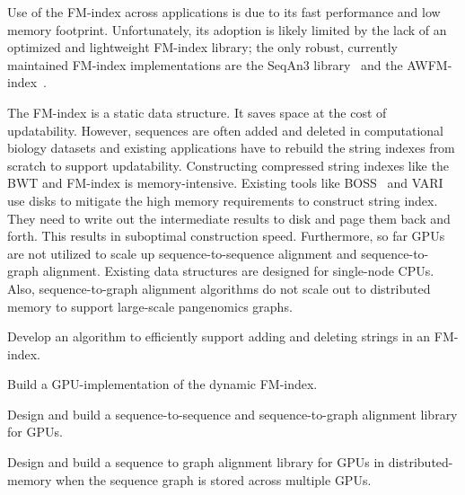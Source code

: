Use of the FM-index across applications is due to its fast performance and low memory footprint. Unfortunately, its adoption is likely limited by the lack of an optimized and lightweight FM-index library; the only robust, currently maintained FM-index implementations are the SeqAn3 library~\cite{Reinert2017} and the AWFM-index~\cite{Anderson2021}.

The FM-index is a static data structure. It saves space at the cost of updatability. However, sequences are often added and deleted in computational biology datasets and existing applications have to rebuild the string indexes from scratch to support updatability.
%
Constructing compressed string indexes like the BWT and FM-index is memory-intensive. Existing tools like BOSS~\cite{Bowe2012} and VARI~\cite{Muggli2019} use disks to mitigate the high memory requirements to construct string index. They need to write out the intermediate results to disk and page them back and forth. This results in suboptimal construction speed.
%
Furthermore, so far GPUs are not utilized to scale up sequence-to-sequence alignment and sequence-to-graph alignment. Existing data structures are designed for single-node CPUs. Also, sequence-to-graph alignment algorithms do not scale out to distributed memory to support large-scale pangenomics graphs.

\begin{rproblem}
Develop an algorithm to efficiently support adding and deleting strings in an FM-index.
\label{rpob:dynamic-fmindex}
\end{rproblem}

\begin{rproblem}
Build a GPU-implementation of the dynamic FM-index.
\label{rpob:gpu-fmindex}
\end{rproblem}


\begin{rproblem}
Design and build a sequence-to-sequence and sequence-to-graph alignment library for GPUs.
\end{rproblem}

\begin{rproblem}
Design and build a sequence to graph alignment library for GPUs in distributed-memory when the sequence graph is stored across multiple GPUs.
\end{rproblem}


